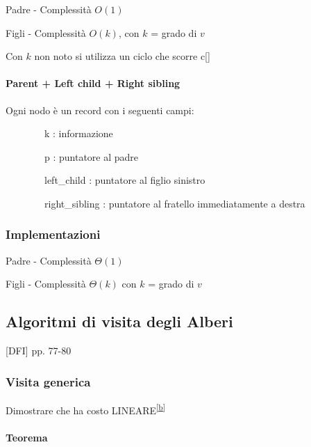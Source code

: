 \documentclass[11pt,a4paper,twoside,openright]{book}
\let\oldparagraph\paragraph
\renewcommand{\paragraph}[1]{\oldparagraph{#1}\mbox{}}
\begin{document}
{{{{Padre - Complessità $O(1)$}



{Figli - Complessità $O(k)$, con $k$ = grado di $v$ }

{Con $k$ non noto si utilizza un ciclo che scorre c{[}{]}}



\paragraph{Parent + Left child + Right sibling}

{Ogni nodo è un record con i seguenti campi:}

{~~~~~~~~k : informazione}

{~~~~~~~~p : puntatore al padre}

{~~~~~~~~left\_child : puntatore al figlio sinistro}

{~~~~~~~~right\_sibling : puntatore al fratello immediatamente a destra}

\subsubsection{Implementazioni}

{Padre - Complessità $\Theta(1)$}



{Figli - Complessità $\Theta(k)$ con $k$ = grado di $v$}



\subsection{Algoritmi di visita degli Alberi}

{{[}DFI{]} pp. 77-80}

\subsubsection{Visita generica}



{Dimostrare che ha costo LINEARE}\textsuperscript{\protect\hyperlink{cmnt2}{{[}b{]}}}

\paragraph{Teorema}

}}}
\end{document}
